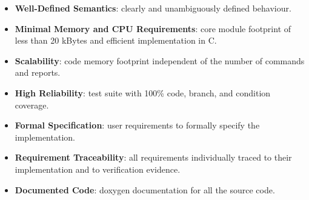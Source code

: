\begin{itemize}
\item{} \textbf{Well-{}Defined Semantics}: clearly and unambiguously defined behaviour.
\item{} \textbf{Minimal Memory and CPU Requirements}: core module footprint of less than 20 kBytes and efficient implementation in C.
\item{} \textbf{Scalability}: code memory footprint independent of the number of commands and reports.
\item{} \textbf{High Reliability}: test suite with 100\% code, branch, and condition coverage.
\item{} \textbf{Formal Specification}: user requirements to formally specify the implementation.
\item{} \textbf{Requirement Traceability}: all requirements individually traced to their implementation and to verification evidence.
\item{} \textbf{Documented Code}: doxygen documentation for all the source code.
\end{itemize}


